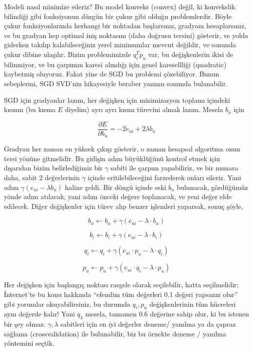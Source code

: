 \documentclass[12pt,fleqn]{article}\usepackage{../../common}
\begin{document}
Modeli nasıl minimize ederiz? Bu model konveks (convex) değil, ki
konvekslik bilindiği gibi fonksiyonun düzgün bir çukur gibi olduğu
problemlerdir. Böyle çukur fonksiyonlarında herhangi bir noktadan
başlarsınız, gradyanı hesaplarsınız, ve bu gradyan hep optimal iniş
noktasını (daha doğrusu tersini) gösterir, ve yolda giderken takılıp
kalabileceğiniz yerel minimumlar mevcut değildir, ve sonunda çukur dibine
ulaşılır. Bizim problemimizde $q_i^Tp_u$ var, bu değişkenlerin ikisi de
bilinmiyor, ve bu çarpımın karesi alındığı için genel karesellliği
(quadratic) kaybetmiş oluyoruz. Fakat yine de SGD bu problemi
çözebiliyor. Bunun sebeplerini, SGD SVD'nin hikayesiyle beraber yazının
sonunda bulanabilir.

SGD için gradyanlar lazım, her değişken için minimizasyon toplamı içindeki
kısmın (bu kısma $E$ diyelim) ayrı ayrı kısmı türevini almak lazım. Mesela
$b_u$ için

$$ \frac{\partial E}{\partial b_u}  = -2e_{ui} + 2 \lambda b_u
$$

Gradyan her zaman en yüksek çıkışı gösterir, o zaman hesapsal algoritma onun
tersi yönüne gitmelidir. Bu gidişin adım büyüklüğünü kontrol etmek için
dışarıdan bizim belirlediğimiz bir $\gamma$ sabiti ile çarpım yapabiliriz, ve
bir numara daha, sabit 2 değerlerinin $\gamma$ içinde eritilebileceğini
farzederek onları sileriz. Yani adım $\gamma(e_{ui} - \lambda b_u)$ haline
geldi. Bir döngü içinde eski $b_u$ bulunacak, gördüğümüz yönde adım atılacak,
yani adım önceki değere toplanacak, ve yeni değer elde edilecek. Diğer
değişkenler için türev alıp benzer işlemleri yaparsak, sonuç şöyle,

$$ b_u \leftarrow b_u + \gamma (e_{ui} - \lambda \cdot b_u) $$

$$ b_i \leftarrow b_i + \gamma (e_{ui} - \lambda \cdot b_i) $$

$$ q_i \leftarrow q_i + \gamma (e_{ui}\cdot p_u - \lambda \cdot q_i) $$

$$ p_u \leftarrow p_u + \gamma (e_{ui}\cdot q_i - \lambda \cdot p_u) $$

Her değişken için başlangıç noktası rasgele olarak seçilebilir, hatta
seçilmelidir; İnternet'te bu konu hakkında ``efendim tüm değerleri 0.1
değeri yapsanız olur'' gibi yorumlar okuyabilirsiniz, bu durumda $q_i,p_u$
değişkenlerinin tüm hücreleri aynı değerde kalır! Yani $q_3$ mesela,
tamamen 0.6 değerine sahip olur, ki bu istenen bir şey
olmaz. $\gamma,\lambda$ sabitleri için en iyi değerler deneme/ yanılma ya
da çapraz sağlama (crossvalidation) ile bulunabilir, biz bu örnekte deneme
/ yanılma yöntemini seçtik.
\end{document}
